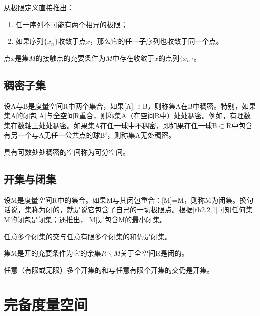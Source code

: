 从极限定义直接推出：
\begin{enumerate}[1)]
	\item 任一序列不可能有两个相异的极限；
	\item 如果序列$\{x_n\}$收敛于点$x$，那么它的任一子序列也收敛于同一个点。
\end{enumerate}

\begin{theorem}
	\label{th2.2.2}
	点$x$是集$M$的接触点的充要条件为$M$中存在收敛于$x$的点列$\{x_n\}$。
\end{theorem}

\subsection{稠密子集}
设A与B是度量空间R中两个集合，如果[A]$\supset$B，则称集A在B中\textcolor[rgb]{1,0,0}{稠密}。特别，如果集A的闭包[A]与全空间R重合，则称集A（在空间R中）\textcolor[rgb]{1,0,0}{处处稠密}。例如，有理数集在数轴上处处稠密。如果集A在任一球中不稠密，即如果在任一球B$\subset$R中包含有另一个与A无任一公共点的球B$'$，则称集A\textcolor[rgb]{1,0,0}{无处稠密}。

具有可数处处稠密的空间称为\textcolor[rgb]{1,0,0}{可分空间}。

\subsection{开集与闭集}
设M是度量空间R中的集合。如果M与其闭包重合：[M]=M，则称M为\textcolor[rgb]{1,0,0}{闭集}。换句话说，集称为闭的，就是说它包含了自己的一切\textcolor[rgb]{1,0,0}{极限点}。根据\cref{th2.2.1}可知任何集M的闭包是闭集；还推出，[M]是包含M的最小闭集。
\begin{theorem}
	\label{th2.2.3}
	任意多个闭集的交与任意有限多个闭集的和仍是闭集。
\end{theorem}

\begin{theorem}
	\label{th2.2.4}
	集M是开的充要条件为它的余集$R\backslash M$关于全空间R是闭的。
\end{theorem}

\begin{theorem}
	\label{th2.2.3'}
	任意（有限或无限）多个开集的和与任意有限个开集的交仍是开集。
\end{theorem}










\section{完备度量空间}
